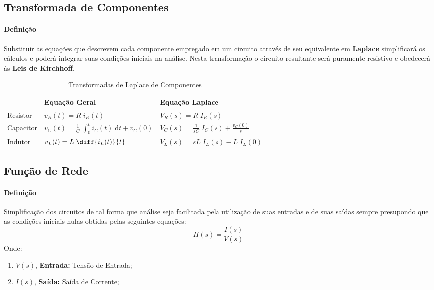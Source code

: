\documentclass{article}
\begin{document}
        \subsection{Transformada de Componentes}
            \paragraph{Definição}Substituir as equações que descrevem cada componente empregado em um circuito através de seu equivalente em \textbf{Laplace} simplificará os cálculos e poderá integrar suas condições iniciais na análise. Nesta transformação o circuito resultante será puramente resistivo e obedecerá às \textbf{Leis de Kirchhoff}.
                \begin{table}[H]
                    \centering
                    \begingroup
                    \renewcommand{\arraystretch}{1.25}
                    \begin{tabular}[]{lll}
                                  & Equação Geral                                                         & Equação Laplace\\\hline
                        Resistor  & $v_{R}(t) = R\;i_{R}(t)$                                              & $V_{R}(s) = R\;I_{R}(s)$\\[2.5mm]
                        Capacitor & $v_{C}(t) = \frac{1}{C}\;\int_{0}^{t} i_{C}(t)\;\text{d}t + v_{C}(0)$ & $V_{C}(s) = \frac{1}{sC}\;I_{C}(s) + \frac{v_{C}(0)}{s}$\\[2.5mm]
                        Indutor   & $v_{L}(t) = L\;\diff{i_{L}(t)}{t}$                                    & $V_{L}(s) = sL\;I_{L}(s) - L\;I_{L}(0)$\\[2.5mm]\hline
                    \end{tabular}
                    \endgroup
                    \caption{Transformadas de Laplace de Componentes}\label{table:LaplaceComponents}
                \end{table} \noindent

        \subsection{Função de Rede}
            \paragraph{Definição}Simplificação dos circuitos de tal forma que análise seja facilitada pela utilização de suas entradas e de suas saídas sempre presupondo que as condições iniciais nulas obtidas pelas seguintes equações:
                \begin{equation}
                    \boxed{H(s) = \frac{I(s)}{V(s)}}
                \end{equation}
            Onde:
                \begin{enumerate}[noitemsep]
                    \item $V(s)$, \textbf{Entrada:} Tensão de Entrada;
                    \item $I(s)$, \textbf{Saída:} Saída de Corrente;
                \end{enumerate}
\end{document}
